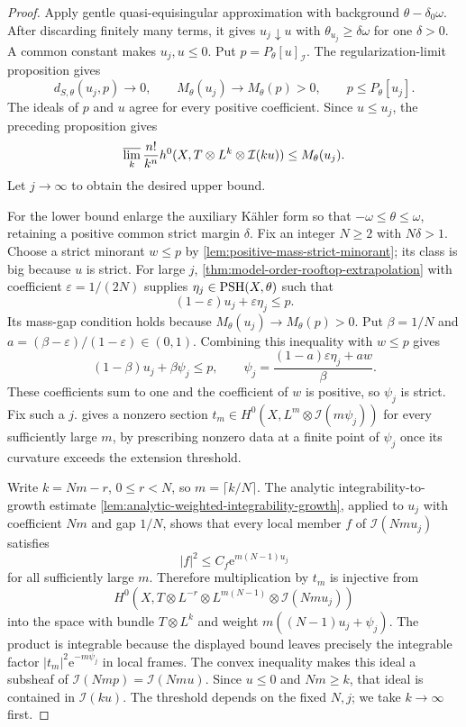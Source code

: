 \begin{proof}
Apply gentle quasi-equisingular approximation with background $\theta-\delta_0\omega$. After discarding finitely many terms, it gives $u_j\downarrow u$ with $\theta_{u_j}\geq\delta\omega$ for one $\delta>0$. A common constant makes $u_j,u\leq0$. Put $p=P_\theta[u]_{\mathcal I}$. The regularization-limit proposition gives
\[
 d_{S,\theta}(u_j,p)\to0,\qquad
 M_\theta(u_j)\to M_\theta(p)>0,
 \qquad p\leq P_\theta[u_j].
\]
The ideals of $p$ and $u$ agree for every positive coefficient. Since $u\leq u_j$, the preceding proposition gives
\[
 \varlimsup_k\frac{n!}{k^n}
      h^0(X,T\otimes L^k\otimes\mathcal I(ku))
       \leq M_\theta(u_j).
\]
Let $j\to\infty$ to obtain the desired upper bound.

For the lower bound enlarge the auxiliary K\"ahler form so that $-\omega\leq\theta\leq\omega$, retaining a positive common strict margin $\delta$. Fix an integer $N\geq2$ with $N\delta>1$. Choose a strict minorant $w\leq p$ by \cref{lem:positive-mass-strict-minorant}; its class is big because $u$ is strict. For large $j$, \cref{thm:model-order-rooftop-extrapolation} with coefficient $\varepsilon=1/(2N)$ supplies $\eta_j\in\mathrm{PSH}(X,\theta)$ such that
\[
 (1-\varepsilon)u_j+\varepsilon\eta_j\leq p.
\]
Its mass-gap condition holds because $M_\theta(u_j)\to M_\theta(p)>0$. Put $\beta=1/N$ and $a=(\beta-\varepsilon)/(1-\varepsilon)\in(0,1)$. Combining this inequality with $w\leq p$ gives
\[
 (1-\beta)u_j+\beta\psi_j\leq p,\qquad
 \psi_j=\frac{(1-a)\varepsilon\eta_j+a w}{\beta}.
\]
These coefficients sum to one and the coefficient of $w$ is positive, so $\psi_j$ is strict. Fix such a $j$.  gives a nonzero section
$t_m\in H^0(X,L^m\otimes\mathcal I(m\psi_j))$ for every sufficiently large $m$, by prescribing nonzero data at a finite point of $\psi_j$ once its curvature exceeds the extension threshold.

Write $k=Nm-r$, $0\leq r<N$, so $m=\lceil k/N\rceil$. The analytic integrability-to-growth estimate \cref{lem:analytic-weighted-integrability-growth}, applied to $u_j$ with coefficient $Nm$ and gap $1/N$, shows that every local member $f$ of $\mathcal I(Nm u_j)$ satisfies
\[
 |f|^2\leq C_f\mathrm e^{m(N-1)u_j}
\]
for all sufficiently large $m$. Therefore multiplication by $t_m$ is injective from
\[
 H^0(X,T\otimes L^{-r}\otimes L^{m(N-1)}
                   \otimes\mathcal I(Nm u_j))
\]
into the space with bundle $T\otimes L^k$ and weight
$m((N-1)u_j+\psi_j)$.
The product is integrable because the displayed bound leaves precisely the integrable factor $|t_m|^2\mathrm e^{-m\psi_j}$ in local frames. The convex inequality makes this ideal a subsheaf of $\mathcal I(Nm p)=\mathcal I(Nm u)$. Since $u\leq0$ and $Nm\geq k$, that ideal is contained in $\mathcal I(ku)$. The threshold depends on the fixed $N,j$; we take $k\to\infty$ first.


\end{proof}
